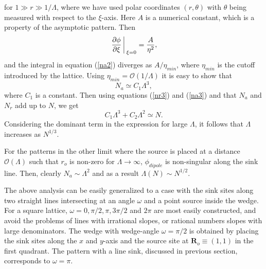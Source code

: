 \documentclass[11pt,a4paper]{book}
\begin{document}
for $1\gg r\gg 1/\Lambda$, where we have used polar coordinates $\left( r, \theta \right)$
with $\theta$ being measured with respect to the $\xi$-axis. Here 
$A$ is a numerical  constant, which is a property of the asymptotic pattern. Then
\begin{equation}
\left.\frac{\partial \phi}{\partial \xi}\right \arrowvert_{\xi=0}=\frac{A}{\eta^{2}},
\label{phi3}
\end{equation}
and the integral in equation (\ref{na2}) diverges as $A/\eta_{min}$, where
$\eta_{min}$ is the cutoff introduced by the lattice. Using $\eta_{min}=\mathcal{O}\left( 1/\Lambda \right)$
it is easy to show that
\begin{equation}
N_{a}\simeq C_{1}\Lambda^{3},
\label{na3}
\end{equation}
where $C_{1}$ is a constant. Then using equations (\ref{nr3}) and (\ref{na3}) and that $N_{a}$ and $N_{r}$ add up to $N$,
we get
\begin{equation}
C_{1}\Lambda^{3}+C_{2}\Lambda^{2}\simeq N.
\label{scalethree}
\end{equation}
Considering the dominant term in the expression for large $\Lambda$, it follows
that $\Lambda$ increases as $N^{1/3}$.

For the patterns in the other limit where the source is placed at a distance
$\mathcal{O}\left( \Lambda \right)$ such that $r_{o}$ is non-zero for $\Lambda\rightarrow\infty$,
$\phi_{dipole}$ is non-singular along  the  sink line. Then, clearly  $N_{a}\sim \Lambda^{2}$ and as a result $\Lambda\left( N \right)\sim N^{1/2}$.

The above analysis can be easily generalized to a case
with the sink sites along two straight lines intersecting at an angle $\omega$
and a point source inside the wedge. For a square lattice,
$\omega=0, \pi/2, \pi, 3\pi/2$ and $2\pi$ are most easily constructed,
and avoid the problems of lines with irrational slopes, or rational numbers 
slopes with large denominators. The wedge with wedge-angle 
$\omega=\pi/2$ is obtained by placing the sink sites along the $x$ and $y$-axis
and the source site at $\mathbf{R}_{o}\equiv\left( 1, 1 \right)$ in
the first quadrant. The pattern with a line sink, discussed in
previous section, corresponds to $\omega=\pi$. 
\end{document}
